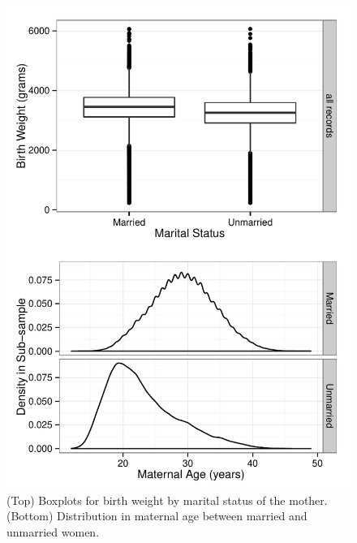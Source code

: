 \documentclass[a4paper, 12pt]{article}
\begin{document}
\begin{itemize}
\begin{figure}[htbp]
\begin{center}
\includegraphics{img/bw-mar.pdf}
\caption{(Top) Boxplots for birth weight by marital status of the mother. (Bottom) Distribution in maternal age between married and unmarried women.}
\label{fig:bwMar}
\end{center}
\end{figure}


\end{itemize}
\end{document}
